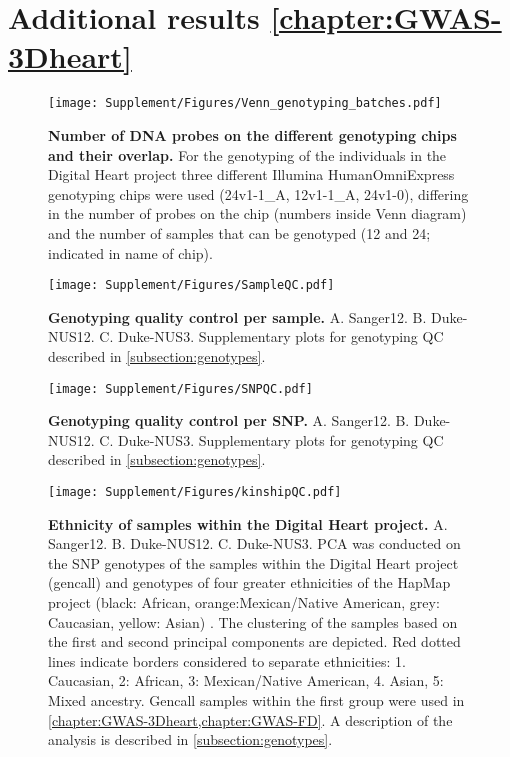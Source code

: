 \newpage
\section{Additional results \cref{chapter:GWAS-3Dheart}}
\begin{figure}[hbtp]
	\centering
	\texttt{[image: Supplement/Figures/Venn\_genotyping\_batches.pdf]}
	\caption[\textbf{Number of DNA probes on the different genotyping chips and their overlap.}]{\textbf{Number of DNA probes on the different genotyping chips and their overlap.} For the genotyping of the individuals in the Digital Heart project three different Illumina HumanOmniExpress genotyping chips were used (24v1-1\_A, 12v1-1\_A, 24v1-0), differing in the number of probes on the chip (numbers inside Venn diagram) and the number of samples that can be genotyped (12 and 24; indicated in name of chip).}
 	\label{fig:probeoverlap}
\end{figure}

\begin{figure}[hbtp]
	\centering
	\texttt{[image: Supplement/Figures/SampleQC.pdf]}
	\caption[\textbf{Genotyping quality control per sample.}]{\textbf{Genotyping quality control per sample.} A. Sanger12. B. Duke-NUS12. C. Duke-NUS3. Supplementary plots for genotyping QC described in \cref{subsection:genotypes}.}
 	\label{fig:sampleQC}
\end{figure}

\begin{figure}[hbtp]
	\centering
	\texttt{[image: Supplement/Figures/SNPQC.pdf]}
	\caption[\textbf{Genotyping quality control per SNP.}]{\textbf{Genotyping quality control per SNP.} A. Sanger12. B. Duke-NUS12. C. Duke-NUS3. Supplementary plots for genotyping QC described in \cref{subsection:genotypes}.}
 	\label{fig:SNPQC}
 	\end{figure}

\begin{figure}[hbtp]
	\centering
	\texttt{[image: Supplement/Figures/kinshipQC.pdf]}
	\caption[\textbf{Ethnicity of samples within the Digitial Heart project. }]{\textbf{Ethnicity of samples within the Digital Heart project.} A. Sanger12. B. Duke-NUS12. C. Duke-NUS3. PCA was conducted on the SNP genotypes of the samples within the Digital Heart project (gencall) and genotypes of four greater ethnicities of the HapMap project (black: African, orange:Mexican/Native American, grey: Caucasian, yellow: Asian) \citep{HapMap2005,HapMap2007}. The clustering of the samples based on the first and second principal components are depicted. Red dotted lines indicate borders considered to separate ethnicities: 1. Caucasian, 2: African, 3: Mexican/Native American, 4. Asian, 5: Mixed ancestry. Gencall samples within the first group were used in \cref{chapter:GWAS-3Dheart,chapter:GWAS-FD}.  A description of the analysis is described in \cref{subsection:genotypes}.}
 	\label{fig:kinshipQC}
\end{figure}

